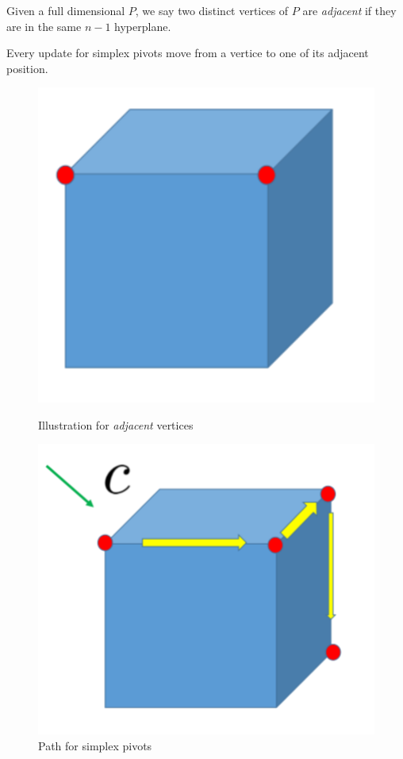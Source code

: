 \begin{definition}
Given a full dimensional $P$, we say two distinct vertices of $P$ are \emph{adjacent} if they are in the same $n-1$ hyperplane.
\end{definition}
\begin{remark}
Every update for simplex pivots move from a vertice to one of its adjacent position.
\end{remark}
\begin{figure}
\centering
\begin{minipage}[t]{0.48\textwidth}
\centering
\includegraphics[width=1\textwidth]{Second_lecture/p_4}
\caption{Illustration for \emph{adjacent} vertices}
\label{fig:2:2}
\end{minipage}
\begin{minipage}[t]{0.48\textwidth}
\centering
\includegraphics[width=1\textwidth]{Second_lecture/p_5}
\caption{Path for simplex pivots}
\label{fig:2:3}
\end{minipage}
\end{figure}

